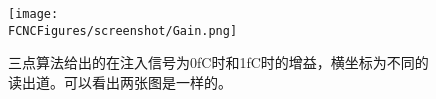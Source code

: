 \begin{figure}[H]
\centering
\texttt{[image: \\FCNCFigures/screenshot/Gain.png]}
\caption{三点算法给出的在注入信号为0fC时和1fC时的增益，横坐标为不同的读出道。可以看出两张图是一样的。}
\label{fig:Gain}
\end{figure}